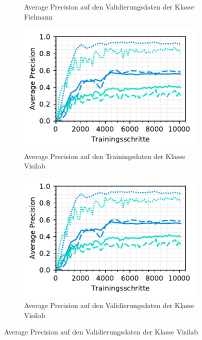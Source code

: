 \begin{figure}[h!]
\begin{subfigure}[b]{0.45\linewidth}
    \caption{Average Precision auf den Validierungsdaten der Klasse Fielmann} 
    \label{fig:specific-ie:fielmann:ap_val}
    \vspace{2ex}
  \end{subfigure}
  \begin{subfigure}[b]{0.45\linewidth}
    \centering
    \includegraphics[scale=1]{graphics/matplot/img-detection__visilab__ap.pdf}
    \caption{Average Precision auf den Trainingsdaten der Klasse Visilab} 
    \label{fig:specific-ie:visilab:ap_train}
    \vspace{2ex}
  \end{subfigure}%
  \begin{subfigure}[b]{0.45\linewidth}
    \centering
    \includegraphics[scale=1]{graphics/matplot/img-detection__visilab__ap.pdf}
    \caption{Average Precision auf den Validierungsdaten der Klasse Visilab} 
    \label{fig:specific-ie:visilab:ap_val}
    \vspace{2ex}
  \end{subfigure}
\end{figure}

